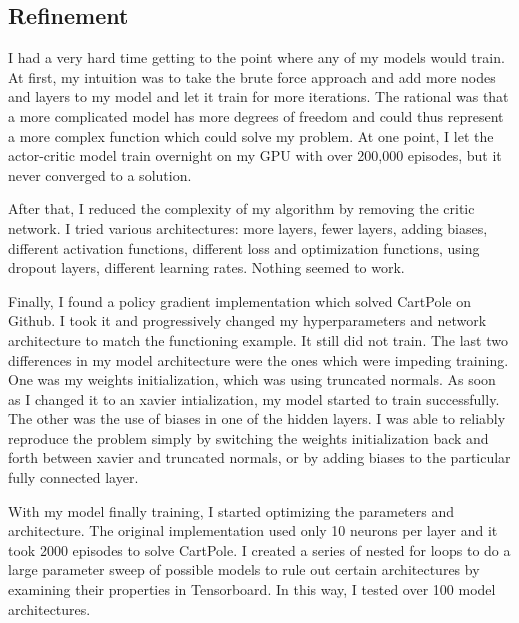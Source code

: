 \documentclass[12pt,a4paper]{article}
\begin{document}
\subsection*{Refinement}

I had a very hard time getting to the point where any of my models would train. At first, my intuition was to take the brute force approach and add more nodes and layers to my model and let it train for more iterations. The rational was that a more complicated model has more degrees of freedom and could thus represent a more complex function which could solve my problem. At one point, I let the actor-critic model train overnight on my GPU with over 200,000 episodes, but it never converged to a solution.

After that, I reduced the complexity of my algorithm by removing the critic network. I tried various architectures: more layers, fewer layers, adding biases, different activation functions, different loss and optimization functions, using dropout layers, different learning rates. Nothing seemed to work.

Finally, I found a policy gradient implementation which solved CartPole on Github. I took it and progressively changed my hyperparameters and network architecture to match the functioning example. It still did not train. The last two differences in my model architecture were the ones which were impeding training. One was my weights initialization, which was using truncated normals. As soon as I changed it to an xavier intialization, my model started to train successfully. The other was the use of biases in one of the hidden layers. I was able to reliably reproduce the problem simply by switching the weights initialization back and forth between xavier and truncated normals, or by adding biases to the particular fully connected layer.

With my model finally training, I started optimizing the parameters and architecture. The original implementation used only 10 neurons per layer and it took 2000 episodes to solve CartPole. I created a series of nested for loops to do a large parameter sweep of possible models to rule out certain architectures by examining their properties in Tensorboard. In this way, I tested over 100 model architectures.
\end{document}
